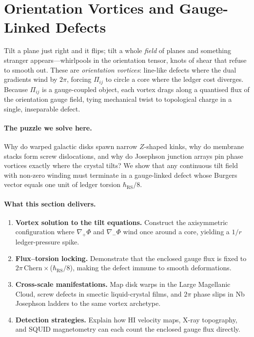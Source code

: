 \documentclass[11pt,oneside]{book}
\begin{document}

\section{Orientation Vortices and Gauge-Linked Defects}
\label{sec:orientation-vortices}

Tilt a plane just right and it flips; tilt a whole \emph{field} of
planes and something stranger appears—whirlpools in the orientation
tensor, knots of shear that refuse to smooth out.  
These are \textit{orientation vortices}: line-like defects where the
dual gradients wind by $2\pi$, forcing $\Pi_{ij}$ to circle a core
where the ledger cost diverges.  
Because $\Pi_{ij}$ is a gauge-coupled object, each vortex drags along
a quantised flux of the orientation gauge field, tying mechanical
twist to topological charge in a single, inseparable defect.

\paragraph{The puzzle we solve here.}
Why do warped galactic disks spawn narrow $Z$-shaped kinks, why do
membrane stacks form screw dislocations, and why do Josephson junction
arrays pin phase vortices exactly where the crystal tilts?  
We show that any continuous tilt field with non-zero winding must
terminate in a gauge-linked defect whose Burgers vector equals one
unit of ledger torsion $\hbar_{\text{RS}}/8$.

\paragraph{What this section delivers.}

\begin{enumerate}[label=\arabic*.,leftmargin=*,itemsep=3pt]
\item \textbf{Vortex solution to the tilt equations.}  
      Construct the axisymmetric configuration where
      $\nabla_{+}\Phi$ and $\nabla_{-}\Phi$ wind once around a core,
      yielding a $1/r$ ledger-pressure spike.
\item \textbf{Flux–torsion locking.}  
      Demonstrate that the enclosed gauge flux is fixed to
      $2\pi$\,Chern $\times$\,($\hbar_{\text{RS}}/8$), making the
      defect immune to smooth deformations.
\item \textbf{Cross-scale manifestations.}  
      Map disk warps in the Large Magellanic Cloud, screw defects in
      smectic liquid-crystal films, and $2\pi$ phase slips in Nb
      Josephson ladders to the same vortex archetype.
\item \textbf{Detection strategies.}  
      Explain how HI velocity maps, X-ray topography, and SQUID
      magnetometry can each count the enclosed gauge flux directly.
\end{enumerate}
\end{document}
